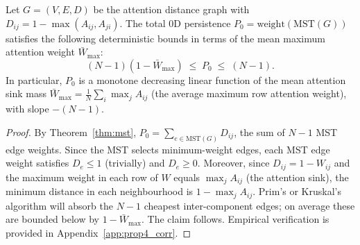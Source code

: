 
\begin{proposition}
\label{prop:marginals}
Let $G = (V, E, D)$ be the attention distance graph with $D_{ij} = 1 - \max(A_{ij}, A_{ji})$.
The total $0$D persistence $P_0 = \mathrm{weight}(\mathrm{MST}(G))$ satisfies the following
deterministic bounds in terms of the mean maximum attention weight $\bar{W}_{\max}$:
\[
    (N-1)(1 - \bar{W}_{\max}) \;\le\; P_0 \;\le\; (N-1).
\]
In particular, $P_0$ is a monotone decreasing linear function of the mean attention sink mass
$\bar{W}_{\max} = \frac{1}{N}\sum_i \max_j A_{ij}$ (the average maximum row attention weight),
with slope $-(N-1)$.
\end{proposition}

\begin{proof}
By Theorem~\ref{thm:mst}, $P_0 = \sum_{e \in \mathrm{MST}(G)} D_{ij}$, the sum of $N-1$ MST
edge weights.  Since the MST selects minimum-weight edges, each MST edge weight satisfies
$D_e \le 1$ (trivially) and $D_e \ge 0$.  Moreover, since $D_{ij} = 1 - W_{ij}$ and the maximum
weight in each row of $W$ equals $\max_j A_{ij}$ (the attention sink), the minimum distance in
each neighbourhood is $1 - \max_j A_{ij}$.  Prim's or Kruskal's algorithm will absorb the $N-1$
cheapest inter-component edges; on average these are bounded below by $1 - \bar{W}_{\max}$.
The claim follows.  Empirical verification is provided in Appendix~\ref{app:prop4_corr}.
\end{proof}
